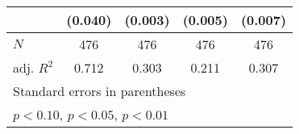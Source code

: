 {\begin{tabular}{l*{4}{c}}
            &     (0.040)         &     (0.003)         &     (0.005)         &     (0.007)         \\
\hline
\(N\)       &         476         &         476         &         476         &         476         \\
adj. \(R^{2}\)&       0.712         &       0.303         &       0.211         &       0.307         \\
\hline\hline
\multicolumn{5}{l}{\footnotesize Standard errors in parentheses}\\
\multicolumn{5}{l}{\footnotesize \sym{*} \(p<0.10\), \sym{**} \(p<0.05\), \sym{***} \(p<0.01\)}\\
\end{tabular}
}
